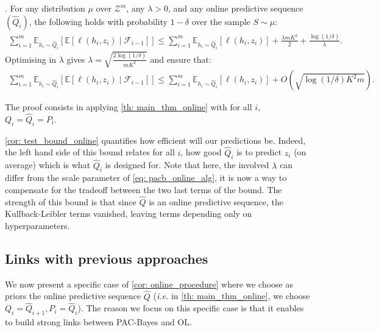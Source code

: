 \begin{corollary}
  \label{cor: test_bound_online}.
  For any distribution $\mu$ over $\mathcal{Z}^m$, any $\lambda>0$, and any online predictive sequence $(\hat{Q}_i)$, the following holds with probability $1-\delta$ over the sample $S\sim \mu$:
  \begin{align*}
    \sum_{i=1}^m \mathbb{E}_{h_i\sim \hat{Q}_{i}}\left[ \mathbb{E}[\ell(h_i,z_i) \mid \mathcal{F}_{i-1}]    \right] \leq \sum_{i=1}^m \mathbb{E}_{h_i\sim \hat{Q}_{i}}\left[ \ell(h_i,z_i) \right] + \frac{\lambda m K^2}{2} + \frac{\log(1/\delta)}{\lambda}.
  \end{align*}
  Optimising in $\lambda$ gives $\lambda= \sqrt{\frac{2\log(1/\delta)}{mK^2} }$ and ensure that:
  \begin{align*}
    \sum_{i=1}^m \mathbb{E}_{h_i\sim \hat{Q}_{i}}\left[ \mathbb{E}[\ell(h_i,z_i) \mid \mathcal{F}_{i-1}]    \right] \leq \sum_{i=1}^m \mathbb{E}_{h_i\sim \hat{Q}_{i}}\left[ \ell(h_i,z_i) \right] + O\left(\sqrt{\log(1/\delta) K^2m}\right).
  \end{align*}

\end{corollary}

The proof consists in applying \cref{th: main_thm_online} with for all $i$, $Q_i= \hat{Q}_{i}= P_i$.

\cref{cor: test_bound_online} quantifies how efficient will our predictions be. Indeed, the left hand side of this bound relates for all $i$, how good $\hat{Q}_i$ is to predict $z_i$ (on average) which is what $\hat{Q}_i$ is designed for.
Note that here, the involved $\lambda$ can differ from the scale parameter of \cref{eq: pacb_online_alg}, it is now a way to compensate for the tradeoff between the two last terms of the bound. The strength of this bound is that since $\hat{Q}$ is an online predictive sequence, the Kullback-Leibler terms vanished, leaving terms depending only on hyperparameters.


\subsection*{Links with previous approaches}

We now present a specific case of \cref{cor: online_procedure} where we choose as priors the online predictive sequence $\hat{Q}$ (\emph{i.e.} in \cref{th: main_thm_online}, we choose $Q_i=\hat{Q}_{i+1}, P_i= \hat{Q}_i$). The reason we focus on this specific case is that it enables to build strong links between PAC-Bayes and OL.

